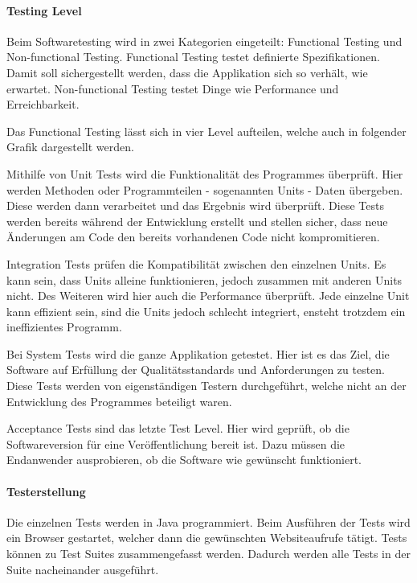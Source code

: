 \paragraph{Testing Level}
Beim Softwaretesting wird in zwei Kategorien eingeteilt: Functional Testing und Non-functional Testing. Functional Testing testet definierte Spezifikationen. Damit soll sichergestellt werden, dass die Applikation sich so verhält, wie erwartet. Non-functional Testing testet Dinge wie Performance und Erreichbarkeit.\cite{TESTING1}

Das Functional Testing lässt sich in vier Level aufteilen, welche auch in folgender Grafik dargestellt werden.


Mithilfe von Unit Tests wird die Funktionalität des Programmes überprüft. Hier werden Methoden oder Programmteilen - sogenannten Units - Daten übergeben. Diese werden dann verarbeitet und das Ergebnis wird überprüft. Diese Tests werden bereits während der Entwicklung erstellt und stellen sicher, dass neue Änderungen am Code den bereits vorhandenen Code nicht kompromitieren. \cite{TESTING3}

\newpage

Integration Tests prüfen die Kompatibilität zwischen den einzelnen Units. Es kann sein, dass Units alleine funktionieren, jedoch zusammen mit anderen Units nicht. Des Weiteren wird hier auch die Performance überprüft. Jede einzelne Unit kann effizient sein, sind die Units jedoch schlecht integriert, ensteht trotzdem ein ineffizientes Programm. \cite{TESTING3}

Bei System Tests wird die ganze Applikation getestet. Hier ist es das Ziel, die Software auf  Erfüllung der Qualitätsstandards und Anforderungen zu testen. Diese Tests werden von eigenständigen Testern durchgeführt, welche nicht an der Entwicklung des Programmes beteiligt waren. \cite{TESTING3}

Acceptance Tests sind das letzte Test Level. Hier wird geprüft, ob die Softwareversion für eine Veröffentlichung bereit ist. Dazu müssen die Endanwender ausprobieren, ob die Software wie gewünscht funktioniert. \cite{TESTING3}

\paragraph{Testerstellung}
Die einzelnen Tests werden in Java programmiert. Beim Ausführen der Tests wird ein Browser gestartet, welcher dann die gewünschten Websiteaufrufe tätigt. Tests können zu Test Suites zusammengefasst werden. Dadurch werden alle Tests in der Suite nacheinander ausgeführt. 

